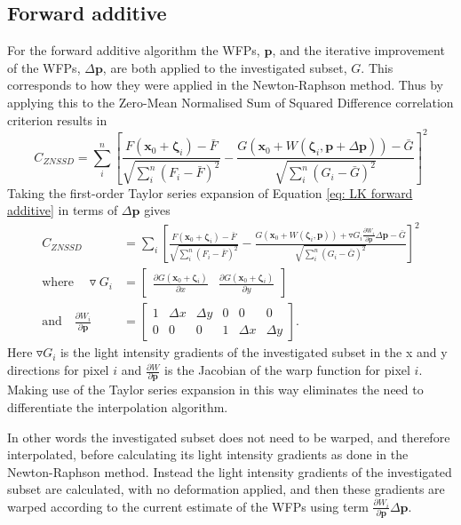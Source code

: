 \documentclass[12pt,oneside,openany,a4paper, %
english, %
masters-t, goldenblock]{usthesis}
\newcommand*\mean[1]{\bar{#1}} %
\begin{document}
\subsection{Forward additive}
\label{sec: forward additive}
For the forward additive algorithm the WFPs, $\bm{p}$, and the iterative improvement of the WFPs, $\Delta \bm{p}$, are both applied to the investigated subset, $G$. This corresponds to how they were applied in the Newton-Raphson method.  Thus by applying this to the Zero-Mean Normalised Sum of Squared Difference correlation criterion results in
\begin{equation}
  C_{ZNSSD} = \sum_i^n  \left[ \frac{F(\bm{x}_0+\bm{\zeta}_i)-\mean{F}}{\sqrt{\sum_i^n (F_i-\mean{F})^2}} -\frac{G(\bm{x}_0+W(\bm{\zeta}_i,\bm{p} + \Delta \bm{p}))-\mean{G}}{\sqrt{\sum_i^n (G_i-\mean{G})^2}}\right]^2
  \label{eq: LK forward additive}
\end{equation}
Taking the first-order  Taylor series expansion of Equation \ref{eq: LK forward additive} in terms of $\Delta \bm{p}$ gives
\begin{align}
  C_{ZNSSD} &= \sum_{i}  \left[ \frac{F(\bm{x}_0+\bm{\zeta}_i)-\mean{F}}{\sqrt{\sum_i^n (F_i-\mean{F})^2}} -\frac{G(\bm{x}_0+W(\bm{\zeta}_i,\bm{p}))+\triangledown G_i \frac{\partial W_i}{\partial \bm{p}} \Delta\bm{p}-\mean{G}}{\sqrt{\sum_i^n (G_i-\mean{G})^2}}\right]^2
  \label{eq: LK forward additive 2} \\
  \text{where} \quad \triangledown G_i &= \begin{bmatrix} \frac{\partial G(\bm{x}_0 + \bm{\zeta}_i)}{\partial x} & \frac{\partial G(\bm{x}_0 + \bm{\zeta}_i)}{\partial y} \end{bmatrix} \quad \\ \text{and} \quad \frac{\partial W_i}{\partial \bm{p}} &= \begin{bmatrix} 1 & \Delta x & \Delta y & 0 & 0 & 0 \\ 0 & 0 & 0 & 1 & \Delta x & \Delta y \end{bmatrix}. \label{eq: LK Jacobian}
\end{align}
Here $\triangledown G_i$ is the light intensity gradients of the investigated subset in the x and y directions for pixel $i$ and $\frac{\partial W}{\partial \bm{p}}$ is the Jacobian of the warp function for pixel $i$. Making use of the Taylor series expansion in this way eliminates the need to differentiate the interpolation algorithm. 

In other words the investigated subset does not need to be warped, and therefore interpolated, before calculating its light intensity gradients as done in the Newton-Raphson method. Instead the light intensity gradients of the investigated subset are calculated, with no deformation applied, and then these gradients are warped according to the current estimate of the WFPs using term $\frac{\partial W_i}{\partial \bm{p}} \Delta \bm{p}$.
\end{document}
